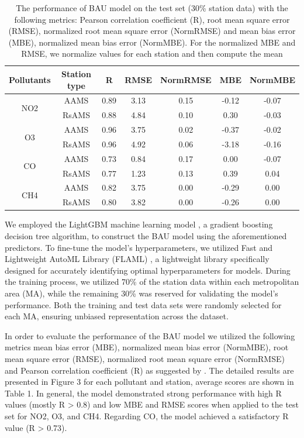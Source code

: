 \begin{table}[!ht]
    \centering
    \caption[Model performance evaluation]{The performance of BAU model on the test set (30\% station data) with the following metrics: Pearson correlation coefficient (R), root mean square error (RMSE), normalized root mean square error (NormRMSE) and mean bias error (MBE), normalized mean bias error (NormMBE). For the normalized MBE and RMSE, we normalize values for each station and then compute the mean}
    \begin{tabular}{c c c c c c c}
        \hline
        Pollutants & Station type & R & RMSE & NormRMSE & MBE & NormMBE \\ \hline
        \multirow{2}{*}{NO2}    & AAMS & 0.89 & 3.13 & 0.15 & -0.12 & -0.07  \\
            & RsAMS & 0.88 & 4.84 & 0.10 & 0.30 & -0.03  \\ \hline
        \multirow{2}{*}{O3}    & AAMS & 0.96 & 3.75 & 0.02 & -0.37 & -0.02  \\
            & RsAMS & 0.96 & 4.92 & 0.06 & -3.18 & -0.16  \\ \hline
        \multirow{2}{*}{CO}    & AAMS & 0.73 & 0.84 & 0.17 & 0.00 & -0.07  \\
            & RsAMS & 0.77 & 1.23 & 0.13 & 0.39 & 0.04  \\ \hline
        \multirow{2}{*}{CH4}    & AAMS & 0.82 & 3.75 & 0.00 & -0.29 & 0.00  \\
            & RsAMS & 0.80 & 3.82 & 0.00 & -0.26 & 0.00  \\ \hline
    \end{tabular}
    \label{tab:chap4_tab1}
\end{table}

We employed the LightGBM machine learning model \citep{ke2017lightgbm}, a gradient boosting decision tree algorithm, to construct the BAU model using the aforementioned predictors. To fine-tune the model's hyperparameters, we utilized Fast and Lightweight AutoML Library (FLAML) \citep{wang2021flaml}, a lightweight library specifically designed for accurately identifying optimal hyperparameters for models. During the training process, we utilized 70\% of the station data within each metropolitan area (MA), while the remaining 30\% was reserved for validating the model's performance. Both the training and test data sets were randomly selected for each MA, ensuring unbiased representation across the dataset.\par

In order to evaluate the performance of the BAU model we utilized the following metrics mean bias error (MBE), normalized mean bias error (NormMBE), root mean square error (RMSE), normalized root mean square error (NormRMSE) and Pearson correlation coefficient (R) as suggested by \citep{grange2021covid}. The detailed results are presented in Figure 3 for each pollutant and station, average scores are shown in Table 1. In general, the model demonstrated strong performance with high R values (mostly R > 0.8) and low MBE and RMSE scores when applied to the test set for NO2, O3, and CH4. Regarding CO, the model achieved a satisfactory R value (R > 0.73).\par


